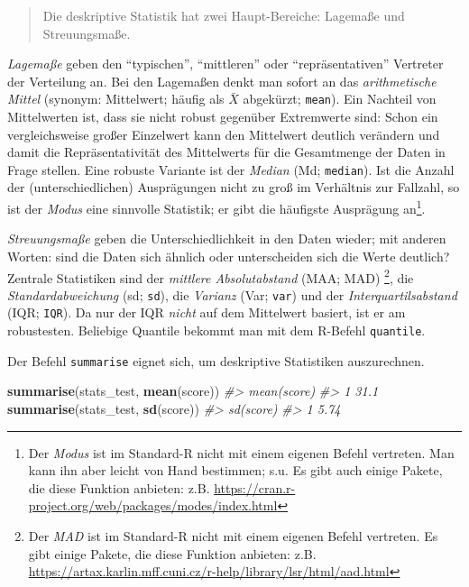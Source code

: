 \documentclass[12pt,ngerman,]{book}
\newenvironment{Shaded}{\begin{snugshade}}{\end{snugshade}}
\newcommand{\KeywordTok}[1]{\textcolor[rgb]{0.13,0.29,0.53}{\textbf{{#1}}}}
\newcommand{\CommentTok}[1]{\textcolor[rgb]{0.56,0.35,0.01}{\textit{{#1}}}}
\newcommand{\NormalTok}[1]{{#1}}
\let\rmarkdownfootnote\footnote%
\def\footnote{\protect\rmarkdownfootnote}
\renewenvironment{Shaded}{\begin{kframe}}{\end{kframe}}
\begin{document}
\begin{quote}
Die deskriptive Statistik hat zwei Haupt-Bereiche: Lagemaße und
Streuungsmaße.
\end{quote}

\emph{Lagemaße} geben den ``typischen'', ``mittleren'' oder
``repräsentativen'' Vertreter der Verteilung an. Bei den
Lagemaßen denkt man sofort an das \emph{arithmetische
Mittel} (synonym: Mittelwert; häufig als \(\bar{X}\) abgekürzt;
\texttt{mean}). Ein Nachteil von Mittelwerten ist, dass sie nicht robust
gegenüber Extremwerte sind: Schon ein vergleichsweise großer Einzelwert
kann den Mittelwert deutlich verändern und damit die Repräsentativität
des Mittelwerts für die Gesamtmenge der Daten in Frage stellen. Eine
robuste Variante ist der \emph{Median} (Md; \texttt{median}). Ist die
Anzahl der (unterschiedlichen) Ausprägungen nicht zu groß im Verhältnis
zur Fallzahl, so ist der \emph{Modus} eine sinnvolle Statistik; er gibt
die häufigste Ausprägung an\footnote{Der \emph{Modus} ist im Standard-R
  nicht mit einem eigenen Befehl vertreten. Man kann ihn aber leicht von
  Hand bestimmen; s.u. Es gibt auch einige Pakete, die diese Funktion
  anbieten: z.B.
  \url{https://cran.r-project.org/web/packages/modes/index.html}}.

\emph{Streuungsmaße} geben die Unterschiedlichkeit
in den Daten wieder; mit anderen Worten: sind die Daten sich ähnlich
oder unterscheiden sich die Werte deutlich? Zentrale Statistiken sind
der \emph{mittlere Absolutabstand} (MAA; MAD) \footnote{Der \emph{MAD}
  ist im Standard-R nicht mit einem eigenen Befehl vertreten. Es gibt
  einige Pakete, die diese Funktion anbieten: z.B.
  \url{https://artax.karlin.mff.cuni.cz/r-help/library/lsr/html/aad.html}},
die \emph{Standardabweichung} (sd; \texttt{sd}), die \emph{Varianz}
(Var; \texttt{var}) und der \emph{Interquartilsabstand} (IQR;
\texttt{IQR}). Da nur der IQR \emph{nicht} auf dem Mittelwert basiert,
ist er am robustesten. Beliebige Quantile bekommt man mit dem R-Befehl
\texttt{quantile}.

Der Befehl \texttt{summarise} eignet sich, um deskriptive Statistiken
auszurechnen.

\begin{Shaded}
\begin{Highlighting}[]
\KeywordTok{summarise}\NormalTok{(stats_test, }\KeywordTok{mean}\NormalTok{(score))}
\CommentTok{#>   mean(score)}
\CommentTok{#> 1        31.1}
\KeywordTok{summarise}\NormalTok{(stats_test, }\KeywordTok{sd}\NormalTok{(score))}
\CommentTok{#>   sd(score)}
\CommentTok{#> 1      5.74}
\end{Highlighting}
\end{Shaded}
\end{document}
